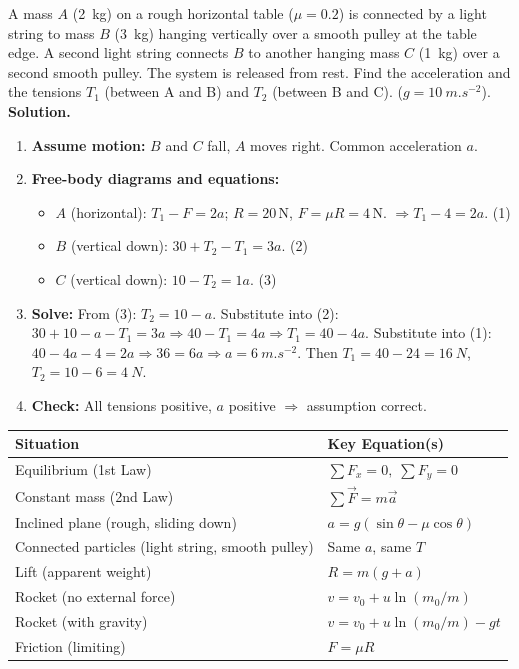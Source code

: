 \documentclass[11pt]{article}
\begin{document}
\begin{exoresolu}
A mass $A$ (\SI{2}{kg}) on a rough horizontal table ($\mu=0.2$) is connected by a light string to mass $B$ (\SI{3}{kg}) hanging vertically over a smooth pulley at the table edge. A second light string connects $B$ to another hanging mass $C$ (\SI{1}{kg}) over a second smooth pulley. The system is released from rest. Find the acceleration and the tensions $T_1$ (between A and B) and $T_2$ (between B and C). ($g=\SI{10}{m.s^{-2}}$).
\tcblower
\textbf{Solution.}
\begin{enumerate}
    \item \textbf{Assume motion:} $B$ and $C$ fall, $A$ moves right. Common acceleration $a$.
    \item \textbf{Free-body diagrams and equations:}
    \begin{itemize}
        \item $A$ (horizontal): $T_1 - F = 2a$; $R = 20\,\mathrm{N}$, $F = \mu R = 4\,\mathrm{N}$.
        $\Rightarrow T_1 - 4 = 2a$. \hfill (1)
        \item $B$ (vertical down): $30 + T_2 - T_1 = 3a$. \hfill (2)
        \item $C$ (vertical down): $10 - T_2 = 1a$. \hfill (3)
    \end{itemize}
    \item \textbf{Solve:} From (3): $T_2 = 10 - a$.
    Substitute into (2): $30 + 10 - a - T_1 = 3a \Rightarrow 40 - T_1 = 4a \Rightarrow T_1 = 40 - 4a$.
    Substitute into (1): $40 - 4a - 4 = 2a \Rightarrow 36 = 6a \Rightarrow a = \SI{6}{m.s^{-2}}$.
    Then $T_1 = 40 - 24 = \SI{16}{N}$, $T_2 = 10 - 6 = \SI{4}{N}$.
    \item \textbf{Check:} All tensions positive, $a$ positive $\Rightarrow$ assumption correct.
\end{enumerate}
\end{exoresolu}

\begin{aretenir}
\begin{center}
\begin{tabular}{|l|l|}
\hline
\textbf{Situation} & \textbf{Key Equation(s)} \\
\hline
Equilibrium (1st Law) & $\sum F_x = 0,\; \sum F_y = 0$ \\
\hline
Constant mass (2nd Law) & $\sum \vec{F} = m\vec{a}$ \\
\hline
Inclined plane (rough, sliding down) & $a = g(\sin\theta - \mu\cos\theta)$ \\
\hline
Connected particles (light string, smooth pulley) & Same $a$, same $T$ \\
\hline
Lift (apparent weight) & $R = m(g+a)$ \\
\hline
Rocket (no external force) & $v = v_0 + u\ln(m_0/m)$ \\
\hline
Rocket (with gravity) & $v = v_0 + u\ln(m_0/m) - gt$ \\
\hline
Friction (limiting) & $F = \mu R$ \\
\hline
\end{tabular}
\end{center}
\end{aretenir}
\end{document}
